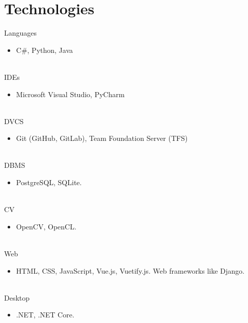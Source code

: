 \documentclass[letterpaper]{twentysecondcv} %
\begin{document}
\section{Technologies}
\begin{twenty}
	
	 \twentyitem
    	{Languages}
		{}
        {}
        {}
        {}
        {
        {\begin{itemize}
        \item C\#, Python, Java
		\end{itemize}}
        }
        \\
	\twentyitem
    	{IDEs}
		{}
        {}
        {}
        {}
        {
        {\begin{itemize}
        \item Microsoft Visual Studio, PyCharm
		\end{itemize}}
        }
        \\
        \twentyitem
    	{DVCS}
		{}
        {}
        {}
        {}
        {
        {\begin{itemize}
        \item Git (GitHub, GitLab), Team Foundation Server (TFS)
		\end{itemize}}
		}
		\\
        \twentyitem
	    {DBMS}
		{}
        {}
        {}
        {}
        {
        {\begin{itemize}
        \item PostgreSQL, SQLite.
		\end{itemize}}
		}
		\\
        \twentyitem
	    {CV}
		{}
        {}
        {}
        {}
        {
        {\begin{itemize}
        \item OpenCV, OpenCL.
		\end{itemize}}
		}
		\\
        \twentyitem
	    {Web}
		{}
        {}
        {}
        {}
        {
        {\begin{itemize}
        \item HTML, CSS, JavaScript, Vue.js, Vuetify.js. Web frameworks like Django.
		\end{itemize}}
		}
		\\
        \twentyitem
	    {Desktop}
		{}
        {}
        {}
        {}
        {
        {\begin{itemize}
        \item .NET, .NET Core.
		\end{itemize}}
}
\end{twenty}
\end{document}
